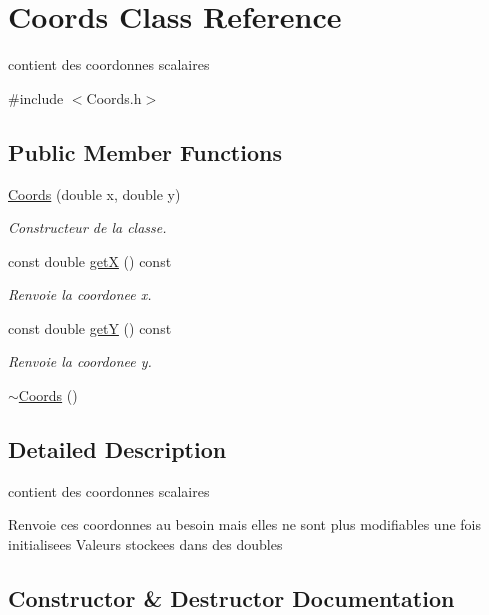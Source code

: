 \hypertarget{class_coords}{}\section{Coords Class Reference}
\label{class_coords}


contient des coordonnes scalaires  




{\ttfamily \#include $<$Coords.\+h$>$}

\subsection*{Public Member Functions}
\begin{DoxyCompactItemize}
\item 
\mbox{\hyperlink{class_coords_accdf1503b400e149ee1c65fa2a61d9b8}{Coords}} (double x, double y)
\begin{DoxyCompactList}\small\item\em Constructeur de la classe. \end{DoxyCompactList}\item 
const double \mbox{\hyperlink{class_coords_ace1df844690c765993d4aab4444dc3bb}{getX}} () const
\begin{DoxyCompactList}\small\item\em Renvoie la coordonee x. \end{DoxyCompactList}\item 
const double \mbox{\hyperlink{class_coords_a97ee10f1880dca8a6139ab69e822d26f}{getY}} () const
\begin{DoxyCompactList}\small\item\em Renvoie la coordonee y. \end{DoxyCompactList}\item 
\mbox{\hyperlink{class_coords_a475cfe7279f33a807a682d6fccb529dc}{$\sim$\+Coords}} ()
\end{DoxyCompactItemize}


\subsection{Detailed Description}
contient des coordonnes scalaires 

Renvoie ces coordonnes au besoin mais elles ne sont plus modifiables une fois initialisees Valeurs stockees dans des doubles 

\subsection{Constructor \& Destructor Documentation}
\mbox{\label{class_coords_accdf1503b400e149ee1c65fa2a61d9b8}} 
